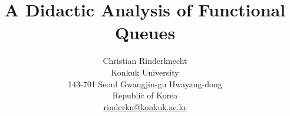 \documentclass{article}
\title{A Didactic Analysis of Functional Queues}
\author{Christian Rinderknecht\\
Konkuk University\\
143-701 Seoul Gwangjin-gu Hwayang-dong\\
Republic of Korea\\
\url{rinderkn@konkuk.ac.kr}}
\date{}
\begin{document}
\maketitle

\allowdisplaybreaks












\bigskip


\end{document}
